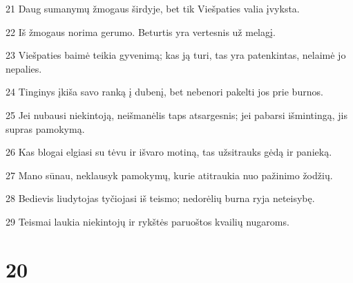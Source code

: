 \par 21 Daug sumanymų žmogaus širdyje, bet tik Viešpaties valia įvyksta. 
\par 22 Iš žmogaus norima gerumo. Beturtis yra vertesnis už melagį. 
\par 23 Viešpaties baimė teikia gyvenimą; kas ją turi, tas yra patenkintas, nelaimė jo nepalies. 
\par 24 Tinginys įkiša savo ranką į dubenį, bet nebenori pakelti jos prie burnos. 
\par 25 Jei nubausi niekintoją, neišmanėlis taps atsargesnis; jei pabarsi išmintingą, jis supras pamokymą. 
\par 26 Kas blogai elgiasi su tėvu ir išvaro motiną, tas užsitrauks gėdą ir panieką. 
\par 27 Mano sūnau, neklausyk pamokymų, kurie atitraukia nuo pažinimo žodžių. 
\par 28 Bedievis liudytojas tyčiojasi iš teismo; nedorėlių burna ryja neteisybę. 
\par 29 Teismai laukia niekintojų ir rykštės paruoštos kvailių nugaroms.



\chapter{20}


